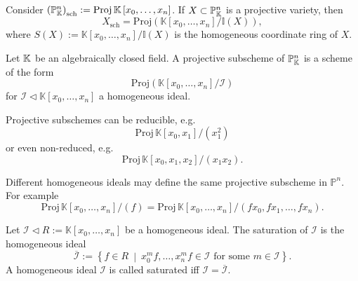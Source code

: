 \begin{ex}
	Consider $\left( \mathbb{P}^{n}_{\mathbb{K}} \right)_{\text{sch}} := \mathrm{Proj}\, \mathbb{K}\left[x_0, \ldots, x_n \right]$.
	If $X \subset \mathbb{P}^{n}_{\mathbb{K}}$ is a projective variety, then
	\begin{equation}
		X_{\text{sch}} = \mathrm{Proj} \left( \mathbb{K}\left[x_0, \ldots, x_n \right]/
		\mathbb{I}\left( X \right) \right)
	,\end{equation} 
	where $S(X) := \mathbb{K}\left[x_0, \ldots, x_n \right] / \mathbb{I}\left( X \right)$ is
	the homogeneous coordinate ring of $X$.
\end{ex} 
 \begin{defn}
	 Let $\mathbb{K}$ be an algebraically closed field.
	 A projective subscheme of $\mathbb{P}^{n}_{\mathbb{K}}$ is a scheme of the form
	 \begin{equation}
		 \mathrm{Proj} \left( \mathbb{K}\left[x_0, \ldots, x_n \right]/ \mathcal{I} \right)
	 \end{equation} 
	 for $\mathcal{I} \triangleleft \mathbb{K}\left[x_0, \ldots, x_n \right]$
	 a homogeneous ideal.
 \end{defn}

 \begin{rem}[]
 	Projective subschemes can be reducible, e.g.
	\begin{equation}
		\mathrm{Proj}\, \mathbb{K}\left[x_0, x_1 \right]/ (x_1^2)
	\end{equation} 
	or even non-reduced, e.g.
	\begin{equation}
		\mathrm{Proj}\, \mathbb{K}\left[x_0, x_1, x_2 \right] / (x_1x_2)
	.\end{equation} 
 \end{rem}
 
 \begin{rem}[]
 	Different homogeneous ideals may define the same projective subscheme in $\mathbb{P}^{n}$.
	For example
	\begin{equation}
		\mathrm{Proj}\, \mathbb{K}\left[x_0, \ldots, x_n \right] / (f) =
		\mathrm{Proj}\, \mathbb{K}\left[x_0, \ldots, x_n \right] /
		(fx_0, fx_1, \ldots, fx_n)
	.\end{equation} 
 \end{rem}
 
 \begin{defn}
 	Let $\mathcal{I} \triangleleft R := \mathbb{K}\left[x_0, \ldots, x_n \right]$
	be a homogeneous ideal.
	The saturation of $\mathcal{I}$ is the homogeneous ideal
	\begin{equation}
	\overline{\mathcal{I}} := \left\{ f \in R \ \middle|\ 
	x_0^mf, \ldots, x_n^mf \in \mathcal{I} \text{ for some } m \in \mathcal{I} \right\}
	.\end{equation} 
	A homogeneous ideal $\mathcal{I}$ is called saturated iff $\mathcal{I} = \overline{\mathcal{I}}$.
 \end{defn}
 
